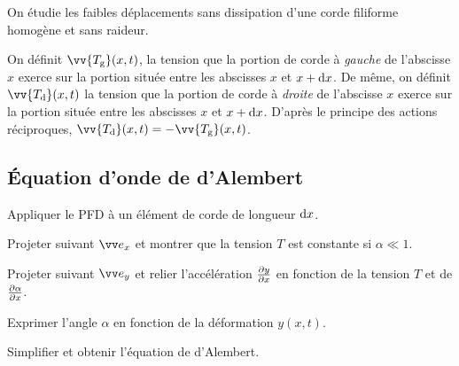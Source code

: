 \documentclass[12pt,fancy]{cours}
\begin{document}
\begin{prop}\label{prop:mod_corde}
On étudie les faibles déplacements sans dissipation d’une corde filiforme homogène et sans raideur.
\end{prop}

On définit $\vv{T_{\rm{g}}}(x,t)$, la tension que la portion de corde à \emph{gauche} de l'abscisse $x$ exerce sur la portion située entre les abscisses $x$ et $x + \mathrm{d} x$. De même, on définit $\vv{T_{\rm{d}}}(x,t)$ la tension que la portion de corde à \emph{droite} de l'abscisse $x$ exerce sur la portion située entre les abscisses $x$ et $x + \mathrm{d} x$. D’après le principe des actions réciproques, $\vv{T_{\rm{d}}}(x,t) = - \vv{T_{\rm{g}}}(x,t)$.

\subsection{Équation d'onde de d'Alembert}

\begin{methode}
  \item	Appliquer le PFD à un élément de corde de longueur $\mathrm{d} x$.
  \item Projeter suivant $\ex$ et montrer que la tension $T$ est constante si $\alpha \ll 1$.
  \item Projeter suivant $\ey$ et relier l’accélération $\frac{\partial{y}}{\partial{x}}$ en fonction de la tension $T$ et de $\frac{\partial{\alpha}}{\partial{x}}$.
  \item Exprimer l’angle $\alpha$ en fonction de la déformation $y(x,t)$.
  \item Simplifier et obtenir l’équation de d’Alembert.
\end{methode}
\end{document}
